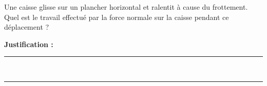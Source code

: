 Une caisse glisse sur un plancher horizontal et ralentit à cause du frottement. Quel est le travail effectué par la force normale sur la caisse pendant ce déplacement ?

\choices

\noindent\textbf{Justification :} \hrulefill \\[2.5ex]
\rule{\linewidth}{0.4pt} \\[2.5ex]
\rule{\linewidth}{0.4pt}
\vfill
